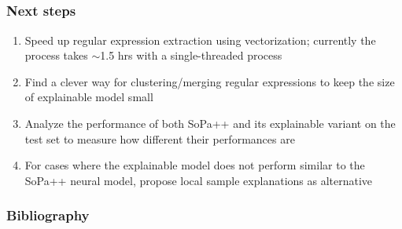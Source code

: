 \documentclass[10pt]{beamer}
\begin{document}
  \subsection{}
  \begin{frame}
		\frametitle{Next steps}
    \begin{enumerate}
      [square]
      \setlength\itemsep{0.8em}
      \item Speed up regular expression extraction using vectorization; currently the process takes $\sim$1.5 hrs with a single-threaded process
      \item Find a clever way for clustering/merging regular expressions to keep the size of explainable model small
      \item Analyze the performance of both SoPa++ and its explainable variant on the test set to measure how different their performances are
      \item For cases where the explainable model does not perform similar to the SoPa++ neural model, propose local sample explanations as alternative
    \end{enumerate}
	\end{frame} 
  
  \begin{frame}[allowframebreaks]
    \frametitle{Bibliography}
    \nocite{*}
    \printbibliography[title = {Bibliography}]
  \end{frame}
\end{document}
